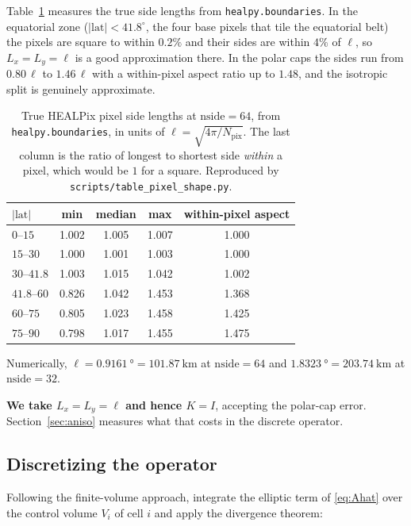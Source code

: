 \documentclass[11pt]{article}
\newcommand{\grid}{\ell}
\newcommand{\Npix}{N_{\mathrm{pix}}}
\begin{document}
Table~\ref{tab:sides} measures the true side lengths from
\texttt{healpy.boundaries}. In the equatorial zone ($|\mathrm{lat}| < 41.8^\circ$, the
four base pixels that tile the equatorial belt) the pixels are square to within
$0.2\%$ and their sides are within $4\%$ of $\grid$, so $L_x = L_y = \grid$ is a good
approximation there. In the polar caps the sides run from $0.80\,\grid$ to $1.46\,\grid$
with a within-pixel aspect ratio up to $1.48$, and the isotropic split is genuinely
approximate.

\begin{table}[htbp]
\centering
\caption{True HEALPix pixel side lengths at $\mathrm{nside}=64$, from
\texttt{healpy.boundaries}, in units of $\grid = \sqrt{4\pi/\Npix}$. The last column is
the ratio of longest to shortest side \emph{within} a pixel, which would be $1$ for a
square. Reproduced by \texttt{scripts/table\_pixel\_shape.py}.}
\label{tab:sides}
\begin{tabular}{lcccc}
\toprule
$|\mathrm{lat}|$ & min & median & max & within-pixel aspect \\
\midrule
$0$--$15$    & 1.002 & 1.005 & 1.007 & 1.000 \\
$15$--$30$   & 1.000 & 1.001 & 1.003 & 1.000 \\
$30$--$41.8$ & 1.003 & 1.015 & 1.042 & 1.002 \\
$41.8$--$60$ & 0.826 & 1.042 & 1.453 & 1.368 \\
$60$--$75$   & 0.805 & 1.023 & 1.458 & 1.425 \\
$75$--$90$   & 0.798 & 1.017 & 1.455 & 1.475 \\
\bottomrule
\end{tabular}
\end{table}

Numerically, $\grid = \SI{0.9161}{\degree} = \SI{101.87}{\kilo\metre}$ at
$\mathrm{nside}=64$ and $\SI{1.8323}{\degree} = \SI{203.74}{\kilo\metre}$ at
$\mathrm{nside}=32$.

\textbf{We take $L_x = L_y = \grid$ and hence $K = I$}, accepting the polar-cap error.
Section~\ref{sec:aniso} measures what that costs in the discrete operator.

\subsection{Discretizing the operator}
\label{sec:discrete}

Following the finite-volume approach, integrate the elliptic term of \eqref{eq:Ahat}
over the control volume $V_i$ of cell $i$ and apply the divergence theorem:
\end{document}
